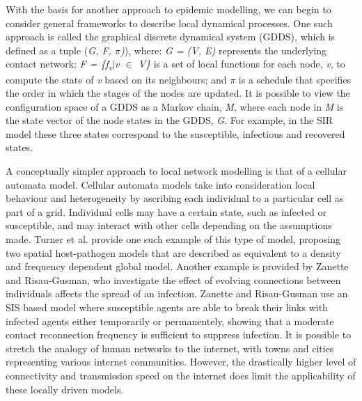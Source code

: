 With the basis for another approach to epidemic modelling, we can
begin to consider general frameworks to describe local dynamical
processes. One such approach is called the graphical discrete
dynamical system (GDDS)\cite{bisset}, which is defined as a tuple
(\emph{G, F, $\pi$)}), where: \emph{G = (V, E)} represents the
underlying contact network;  \emph{F = \{f\textsubscript{v}$|$v $\in$
  V\}} is a set of local functions for each node, \emph{v}, to compute
the state of \emph{v} based on its neighbours; and $\pi$ is a schedule
that specifies the order in which the stages of the nodes are
updated. It is possible to view the configuration space of a GDDS as a
Markov chain, \emph{M}, where each node in \emph{M} is the state
vector of the node states in the GDDS, \emph{G}. For example, in the
SIR model these three states correspond to the susceptible, infectious
and recovered states. 

A conceptually simpler approach to local network modelling is that of
a cellular automata model. Cellular automata models take into
consideration local behaviour and heterogeneity by ascribing each
individual to a particular cell as part of a grid. Individual cells
may have a certain state, such as infected or susceptible, and may
interact with other cells depending on the assumptions made. Turner et
al. provide one such example of this type of model, proposing two
spatial host-pathogen models that are described as equivalent to a
density and frequency dependent global model.\cite{turner} Another
example is provided by Zanette and Risau-Gusman, who investigate the
effect of evolving connections between individuals affects the spread
of an infection. Zanette and Risau-Gusman use an SIS based model where
susceptible agents are able to break their links with infected agents
either temporarily or permanentely, showing that a moderate contact
reconnection frequency is sufficient to suppress
infection.\cite{zanette}  It is possible to stretch the analogy of
human networks to the internet, with towns and cities representing
various internet communities. However, the drastically higher level of
connectivity and transmission speed on the internet does limit the
applicability of these locally driven models.

